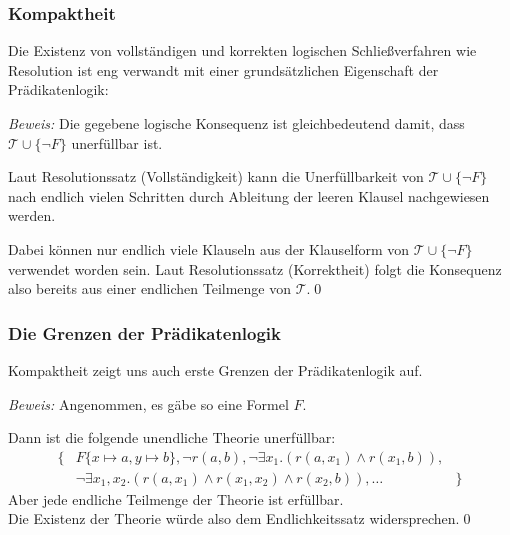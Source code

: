\documentclass[aspectratio=1610,onlymath]{beamer}
\begin{document}
\begin{frame}\frametitle{Kompaktheit}

Die Existenz von vollständigen und korrekten logischen Schließverfahren wie Resolution
ist eng verwandt mit einer grundsätzlichen Eigenschaft der Prädikatenlogik:\bigskip

\pause

\small
\emph{Beweis:} Die gegebene logische Konsequenz ist gleichbedeutend damit, dass
$\mathcal{T}\cup\{\neg F\}$ unerfüllbar ist.\medskip

Laut Resolutionssatz (Vollständigkeit) kann die Unerfüllbarkeit von $\mathcal{T}\cup\{\neg F\}$ nach endlich vielen Schritten durch Ableitung der leeren Klausel nachgewiesen werden.\medskip

Dabei können nur endlich viele Klauseln aus der Klauselform von $\mathcal{T}\cup\{\neg F\}$ verwendet worden sein. Laut Resolutionssatz (Korrektheit) folgt die Konsequenz also bereits aus einer endlichen Teilmenge von $\mathcal{T}$.\qed

\end{frame}

\begin{frame}\frametitle{Die Grenzen der Prädikatenlogik}

Kompaktheit zeigt uns auch erste Grenzen der Prädikatenlogik auf.
\smallskip

\pause

\pause

\emph{Beweis:} Angenommen, es gäbe so eine Formel $F$.\medskip

Dann ist die folgende unendliche Theorie unerfüllbar:
\[\begin{array}{rll}
\big\{ & F\{x\mapsto a,y\mapsto b\},\neg r(a,b), \neg \exists x_1.(r(a,x_1)\wedge r(x_1,b)),\\
& \neg\exists x_1,x_2.(r(a,x_1)\wedge
r(x_1,x_2)\wedge r(x_2,b)),\ldots & \big\}
\end{array}\]
Aber jede endliche Teilmenge der Theorie ist erfüllbar.\\
Die Existenz der Theorie würde also dem Endlichkeitssatz widersprechen.\qed

\end{frame}
\end{document}
